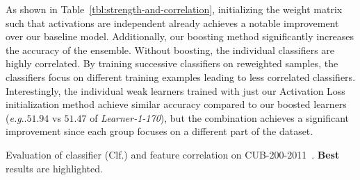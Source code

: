 \documentclass[10pt,journal,compsoc]{IEEEtran}
\makeatletter
\DeclareRobustCommand\onedot{\futurelet\@let@token\@onedot}
\def\@onedot{\ifx\@let@token.\else.\null\fi\xspace}
\def\eg{\emph{e.g}\onedot} \def\Eg{\emph{E.g}\onedot}
\makeatother
\begin{document}
As shown in Table~\ref{tbl:strength-and-correlation}, initializing
the weight matrix such that activations are independent already achieves a notable improvement over our baseline model. 
Additionally, our boosting method significantly increases the accuracy of the ensemble.
Without boosting, the
individual classifiers are highly correlated. By training successive
classifiers on reweighted samples, the classifiers focus on different
training examples leading to less correlated classifiers. 
Interestingly, the individual weak learners trained with just our Activation Loss initialization method achieve similar accuracy compared to our
boosted learners (\eg$51.94$ vs $51.47$ of \emph{Learner-1-170}), but the combination achieves a significant improvement since each group focuses
on a different part of the dataset.

\begin{table}[htbp]
\caption{Evaluation of classifier (Clf.) and feature correlation on CUB-200-2011~\cite{WahCUB_200_2011}. \textbf{Best} results are highlighted.}
\label{tbl:strength-and-correlation}
\renewcommand{\arraystretch}{1.3}

\centering


\end{table}
\end{document}
